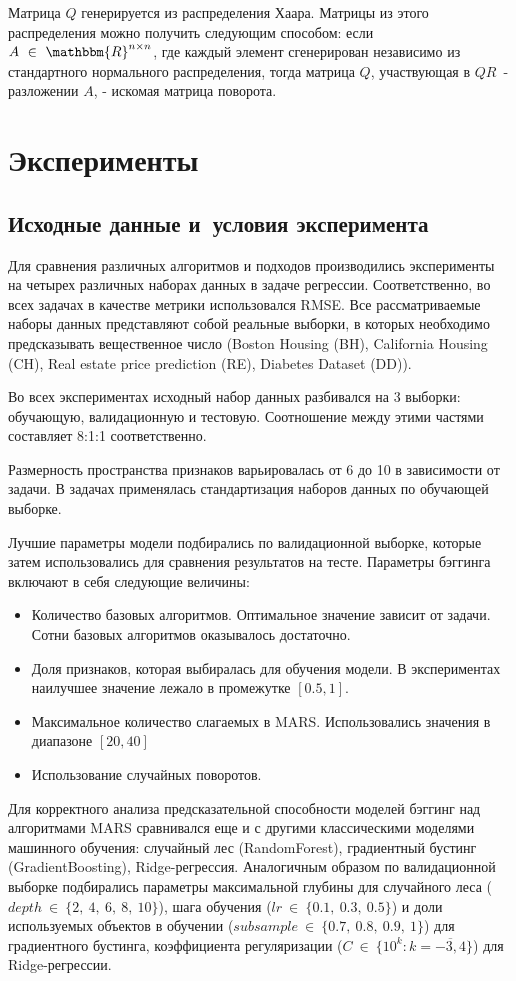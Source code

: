 \documentclass{article}
\begin{document}
Матрица $Q$ генерируется из распределения Хаара. Матрицы из этого распределения можно получить следующим способом: если $A~\in~\mathbbm{R}^{n \times n}$, где каждый элемент сгенерирован независимо из стандартного нормального распределения, тогда матрица $Q$, участвующая в $QR$~-разложении $A$, - искомая матрица поворота.


\section{Эксперименты}
\subsection{Исходные данные и~условия эксперимента}
 
Для сравнения различных алгоритмов и подходов производились эксперименты на четырех различных наборах данных в задаче регрессии. Соответственно, во всех задачах в качестве метрики использовался RMSE.
Все рассматриваемые наборы данных представляют собой реальные выборки, в которых необходимо предсказывать вещественное число (Boston Housing (BH), California Housing (CH), Real estate price prediction (RE), Diabetes Dataset (DD)).

Во всех экспериментах исходный набор данных разбивался на 3 выборки:
обучающую, валидационную и тестовую. Соотношение между этими частями составляет 8:1:1 соответственно.

Размерность пространства признаков варьировалась от 6 до 10 в зависимости от задачи. В задачах применялась стандартизация наборов данных по обучающей выборке. 

Лучшие параметры модели подбирались по валидационной выборке, которые затем использовались для сравнения результатов на тесте.
Параметры бэггинга включают в себя следующие величины:
\begin{itemize}
    \item Количество базовых алгоритмов. Оптимальное значение зависит от задачи. Сотни базовых алгоритмов оказывалось достаточно.
    \item Доля признаков, которая выбиралась для обучения модели. В экспериментах наилучшее значение лежало в промежутке $[0.5, 1]$.
    \item Максимальное количество слагаемых в MARS. Использовались значения в диапазоне $[20, 40]$
    \item Использование случайных поворотов.
\end{itemize}

Для корректного анализа предсказательной способности моделей бэггинг над алгоритмами MARS сравнивался еще и с другими классическими моделями машинного обучения: случайный лес (RandomForest), градиентный бустинг (GradientBoosting), Ridge-регрессия. Аналогичным образом по валидационной выборке подбирались параметры максимальной глубины для случайного леса ($depth~\in~\{2,~4,~6,~8,~10\}$), шага обучения
($lr~\in~\{0.1,~0.3,~0.5\}$) и доли используемых объектов в обучении
($subsample~\in~\{0.7,~0.8,~0.9,~1\}$) для градиентного бустинга, коэффициента регуляризации ($C~\in~\{10^k:k=\overline{-3,4}\}$) для Ridge-регрессии. 
\end{document}
